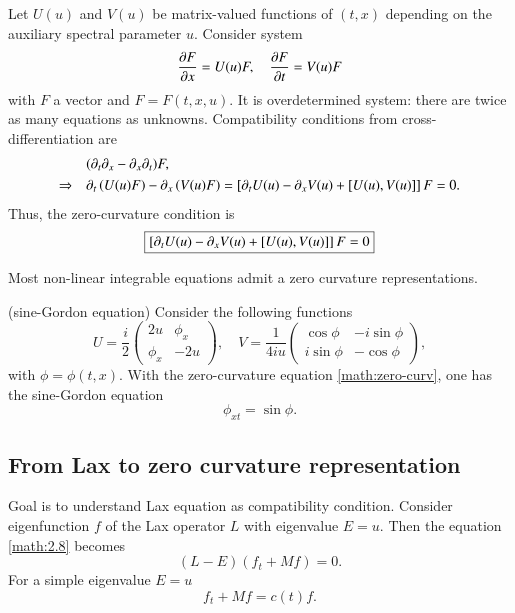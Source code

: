 Let $U(u)$ and $V(u)$ be matrix-valued functions of $(t, x)$ depending on the auxiliary spectral parameter $u$. Consider system 
\begin{equation*}
	\pdv{F}{x} = U(u) F, \quad \pdv{F}{t} = V(u) F
\end{equation*}
with $F$ a vector and $F = F(t, x, u)$. It is overdetermined system: there are twice as many equations as unknowns. Compatibility conditions from cross-differentiation are
\begin{align*}
	&(\partial_t \partial_x - \partial_x \partial_t )F, \\
	\Rightarrow \quad & \partial_t \left(U(u) F\right) - \partial_x \left(V(u) F\right) = \left[ \partial_t U(u) - \partial_x V(u) + \comm{U(u)}{V(u)} \right]  F = 0.
\end{align*}
Thus, the zero-curvature condition is 
\begin{equation}
	\boxed{
	\left[ \partial_t U(u) - \partial_x V(u) + \comm{U(u)}{V(u)} \right]  F = 0
	}
	\label{math:zero-curv}
\end{equation}

Most non-linear integrable equations admit a zero curvature representations.

\begin{example} (sine-Gordon equation)
	Consider the following functions
\begin{equation*}
	U = \frac{i}{2} \begin{pmatrix} 2u & \phi_x \\ \phi_x & -2u \end{pmatrix}, \quad
	V = \frac{1}{4iu} \begin{pmatrix} \cos{\phi} & -i\sin{\phi} \\ i \sin{\phi} & -\cos{\phi} \end{pmatrix},
\end{equation*}
with $\phi = \phi(t,x)$. With the zero-curvature equation \eqref{math:zero-curv}, one has the sine-Gordon equation
\begin{equation*}
	\phi_{xt} = \sin{\phi}.
\end{equation*}
\end{example}

\subsection{From Lax to zero curvature representation}
Goal is to understand Lax equation as compatibility condition. Consider eigenfunction $f$ of the Lax operator $L$  with eigenvalue $E = u$. Then the equation \eqref{math:2.8} becomes
\begin{equation*}
	(L-E) (f_t + Mf) = 0.
\end{equation*}
For a simple eigenvalue $E=u$
\begin{equation*}
	f_t + Mf = c(t) f.
\end{equation*}

